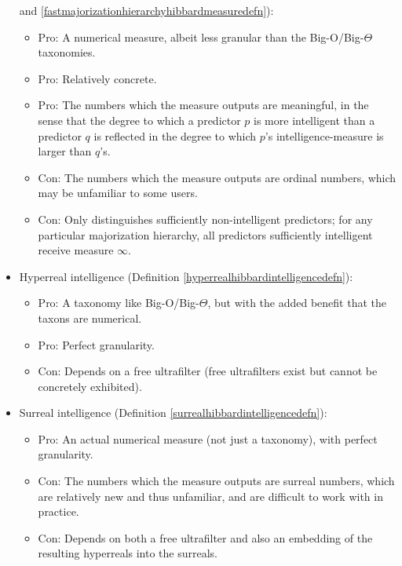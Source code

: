 \documentclass[twoside,11pt]{article}
\begin{document}
\begin{itemize}
    and \ref{fastmajorizationhierarchyhibbardmeasuredefn}):
    \begin{itemize}
        \item
        Pro: A numerical measure, albeit less granular than the
        Big-O/Big-$\Theta$ taxonomies.
        \item
        Pro: Relatively concrete.
        \item
        Pro: The numbers which the measure outputs are meaningful, in the sense that
        the degree to which a predictor $p$ is more intelligent than a
        predictor $q$ is reflected
        in the degree to which $p$'s intelligence-measure is larger than $q$'s.
        \item
        Con: The numbers which the measure outputs are ordinal numbers, which may be
        unfamiliar to some users.
        \item
        Con: Only distinguishes sufficiently non-intelligent predictors; for any particular
        majorization hierarchy, all predictors
        sufficiently intelligent receive measure $\infty$.
    \end{itemize}
    \item
    Hyperreal intelligence (Definition \ref{hyperrealhibbardintelligencedefn}):
    \begin{itemize}
        \item
        Pro: A taxonomy like Big-O/Big-$\Theta$, but with the added benefit
        that the taxons are numerical.
        \item
        Pro: Perfect granularity.
        \item
        Con: Depends on a free ultrafilter (free ultrafilters exist but cannot be
        concretely exhibited).
    \end{itemize}
    \item
    Surreal intelligence (Definition \ref{surrealhibbardintelligencedefn}):
    \begin{itemize}
        \item
        Pro: An actual numerical measure (not just a taxonomy), with
        perfect granularity.
        \item
        Con: The numbers which the measure outputs are surreal numbers,
        which are relatively new and thus unfamiliar, and are difficult
        to work with in practice.
        \item
        Con: Depends on both a free ultrafilter and also an embedding of
        the resulting hyperreals into the surreals.
    \end{itemize}
\end{itemize}
\end{document}

